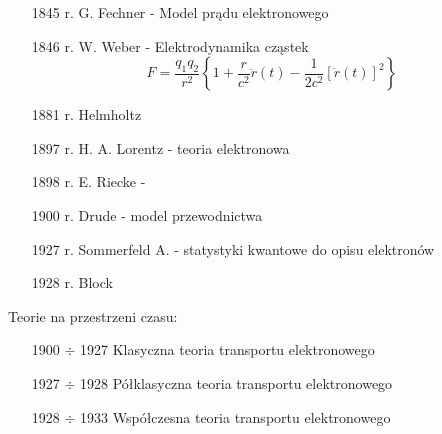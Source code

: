 \begin{itemize}
	\item[1845 r.] G. Fechner - Model prądu elektronowego 
	\item[1846 r.] W. Weber - Elektrodynamika cząstek
		$$ F = \dfrac{q_1q_2}{r^2} \left\{ 1 + \dfrac{r}{c^2} \ddot{r} (t) -
		\dfrac{1}{2c^2} \left[ \dot{r} (t) \right]^2 \right\} $$
	\item[1881 r.] Helmholtz
	\item[1897 r.] H. A. Lorentz - teoria elektronowa
	\item[1898 r.] E. Riecke - 
	\item[1900 r.] Drude - model przewodnictwa
	\item[1927 r.] Sommerfeld A. - statystyki kwantowe do opisu elektronów
	\item[1928 r.] Block
\end{itemize}
Teorie na przestrzeni czasu:
\begin{itemize}
	\item[1900 $\div$ 1927] Klasyczna teoria transportu elektronowego 
	\item[1927 $\div$ 1928] Półklasyczna teoria transportu elektronowego
	\item[1928 $\div$ 1933] Współczesna teoria transportu elektronowego 
\end{itemize}

